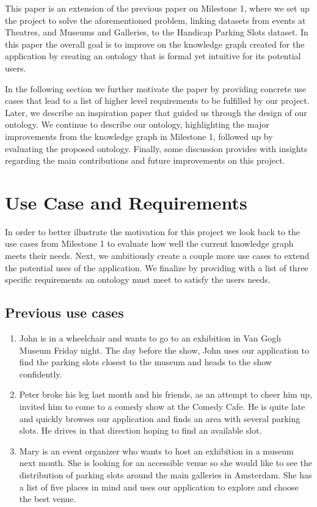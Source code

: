 \documentclass[runningheads,a4paper]{../../StyleFiles/llncs}
\begin{document}
This paper is an extension of the previous paper on Milestone 1, where we set up the project to solve the aforementioned problem, linking datasets from events at Theatres, and Museums and Galleries, to the Handicap Parking Slots dataset. In this paper the overall goal is to improve on the knowledge graph created for the application by creating an ontology that is formal yet intuitive for its potential users.

In the following section we further motivate the paper by providing concrete use cases that lead to a list of higher level requirements to be fulfilled by our project. Later, we describe an inspiration paper that guided us through the design of our ontology. We continue to describe our ontology, highlighting the major improvements from the knowledge graph in Milestone 1, followed up by evaluating the proposed ontology. Finally, some discussion provides with insights regarding the main contributions and future improvements on this project.

\section{Use Case and Requirements}
In order to better illustrate the motivation for this project we look back to the use cases from Milestone 1 to evaluate how well the current knowledge graph meets their needs. Next, we ambitiously create a couple more use cases to extend the potential uses of the application. We finalize by providing with a list of three specific requirements an ontology must meet to satisfy the users needs.

\subsection{Previous use cases}
\begin{enumerate}
	\item John is in a wheelchair and wants to go to an exhibition in Van Gogh Museum Friday night. The day before the show, John uses our application to find the parking slots closest to the museum and heads to the show confidently. 
	\item Peter broke his leg last month and his friends, as an attempt to cheer him up, invited him to come to a comedy show at the Comedy Cafe. He is quite late and quickly browses our application and finds an area with several parking slots. He drives in that direction hoping to find an available slot. 
	\item Mary is an event organizer who wants to host an exhibition in a museum next month. She is looking for an accessible venue so she would like to see the distribution of parking slots around the main galleries in Amsterdam. She has a list of five places in mind and uses our application to explore and choose the best venue.
\end{enumerate}
\end{document}
